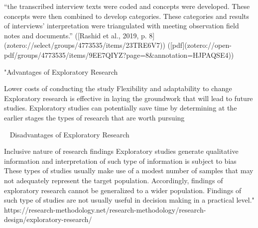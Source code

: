 “the transcribed interview texts were coded and concepts were developed. These concepts were then combined to develop categories. These categories and results of interviews’ interpretation were triangulated with meeting observation field notes and documents.” ([Rashid et al., 2019, p. 8](zotero://select/groups/4773535/items/23TRE6V7)) ([pdf](zotero://open-pdf/groups/4773535/items/9EE7QIYZ?page=8&annotation=HJPAQSE4))


"Advantages of Exploratory Research

    Lower costs of conducting the study
    Flexibility and adaptability to change
    Exploratory research is effective in laying the groundwork that will lead to future studies.
    Exploratory studies can potentially save time by determining at the earlier stages the types of research that are worth pursuing

 
Disadvantages of Exploratory Research

    Inclusive nature of research findings
    Exploratory studies generate qualitative information and interpretation of such type of information is subject to bias
    These types of studies usually make use of a modest number of samples that may not adequately represent the target population. Accordingly, findings of exploratory research cannot be generalized to a wider population.
    Findings of such type of studies are not usually useful in decision making in a practical level."
    https://research-methodology.net/research-methodology/research-design/exploratory-research/


